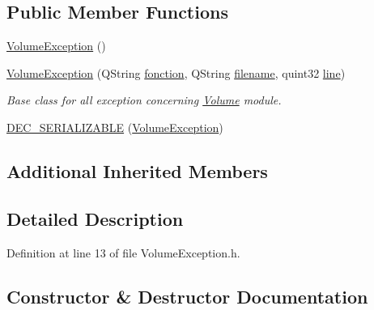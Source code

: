 \subsection*{Public Member Functions}
\begin{DoxyCompactItemize}
\item 
\hyperlink{class_gost_crypt_1_1_volume_1_1_volume_exception_a6c5fc1311ae7877609927f64f2c34249}{Volume\+Exception} ()
\item 
\hyperlink{class_gost_crypt_1_1_volume_1_1_volume_exception_ac685ccc0c7261edb1174a87baece9cb1}{Volume\+Exception} (Q\+String \hyperlink{class_gost_crypt_1_1_gost_crypt_exception_a29b8c93d5efbb1ff369107385725a939}{fonction}, Q\+String \hyperlink{class_gost_crypt_1_1_gost_crypt_exception_a749a12375f4ba9d502623b99d8252f38}{filename}, quint32 \hyperlink{class_gost_crypt_1_1_gost_crypt_exception_abf506d911f12a4e969eea500f90bd32c}{line})
\begin{DoxyCompactList}\small\item\em Base class for all exception concerning \hyperlink{class_gost_crypt_1_1_volume_1_1_volume}{Volume} module. \end{DoxyCompactList}\item 
\hyperlink{class_gost_crypt_1_1_volume_1_1_volume_exception_a24f9f3cb8bacc0dc9500d9df758a73b6}{D\+E\+C\+\_\+\+S\+E\+R\+I\+A\+L\+I\+Z\+A\+B\+LE} (\hyperlink{class_gost_crypt_1_1_volume_1_1_volume_exception}{Volume\+Exception})
\end{DoxyCompactItemize}
\subsection*{Additional Inherited Members}


\subsection{Detailed Description}


Definition at line 13 of file Volume\+Exception.\+h.



\subsection{Constructor \& Destructor Documentation}
\mbox{\label{class_gost_crypt_1_1_volume_1_1_volume_exception_a6c5fc1311ae7877609927f64f2c34249}} 
